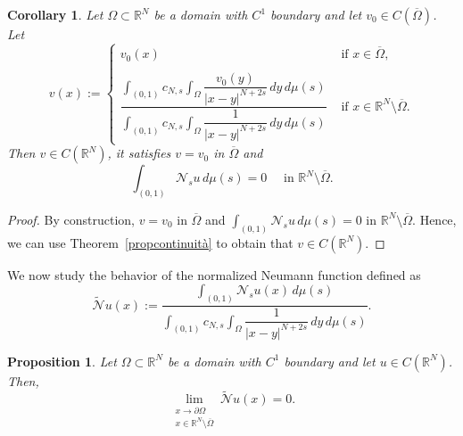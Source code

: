 \documentclass[12pt,a4paper,intlimits,sumlimits]{amsart}
\def \R {\mathbb{R}}
\def \Ns {\mathscr{N}_{s}}
\theoremstyle{definition}
\theoremstyle{plain}
\newtheorem{proposition}[definition]{Proposition}
\newtheorem{corollary}[definition]{Corollary}
\numberwithin{equation}{section}
\begin{document}
\begin{corollary}\label{corollariocontinuità}
Let $\Omega\subset \R^N$ be a domain with $C^1$ boundary and 
let $v_0\in C(\overline{\Omega})$. Let 
\[
v(x):=
\begin{cases}
v_0(x)    & \mbox{ if } x\in \overline{\Omega},
\\ 

\\
\dfrac{\displaystyle\int_{(0,1)} c_{N, s} \int_{\Omega}\dfrac{v_0(y)}{|x-y|^{N+2s}}\,dy\,d\mu(s)}{\displaystyle\int_{(0,1)}c_{N, s}\int_{\Omega}\dfrac{1}{|x-y|^{N+2s}}\,dy\,d\mu(s)}
& \mbox{ if } x\in \R^N\setminus \overline{\Omega}.
\end{cases}
\]
Then $v\in C(\R^N)$, it satisfies $v=v_0$ in $\overline{\Omega}$
and 
\[
\int_{(0,1)}\Ns u\,d\mu(s)=0 \quad\mbox{ in } \R^N\setminus \overline{\Omega}.
\]
\end{corollary}

\begin{proof}
By construction, $v=v_0$ in $\overline{\Omega}$
and $\int_{(0,1)}\Ns u\,d\mu(s)=0$ in $\R^N\setminus \overline{\Omega}$. Hence,  we can use Theorem~\ref{propcontinuità} to obtain that $v\in C(\R^N)$.
\end{proof}

We now study the behavior of the normalized Neumann function 
defined as
\begin{equation}\label{NTILDEE}
\widetilde{\mathscr N}u(x):=\frac{\displaystyle\int_{(0,1)}\Ns u(x)\,d\mu(s)}{\displaystyle\int_{(0,1)}c_{N, s}\int_{\Omega}\dfrac{1}{|x-y|^{N+2s}}\,dy\,d\mu(s)}.
\end{equation}

\begin{proposition}\label{ASMDNSDIKF}
Let $\Omega\subset \R^N$ be a domain with $C^1$ boundary and
let $u\in C(\R^N)$. Then,
\begin{equation}\label{limiteNtilde}
\lim_{\substack{x\to \partial \Omega \\ x\in \R^N\setminus \overline{\Omega}}}\widetilde{\mathscr N}u(x)=0.
\end{equation}
\end{proposition}
\end{document}
